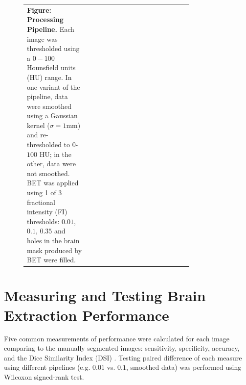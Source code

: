 \documentclass[final]{beamer}\usepackage[]{graphicx}\usepackage[]{color}
\begin{document}
\begin{frame}[fragile]
\begin{multicols}{2}
\begin{figure}
\begin{tabular}{m{0.3\linewidth}>{\centering}m{0.3\linewidth}p{0.2\linewidth}}
\multirow{1}{\linewidth}[5\baselineskip]{{\bf Figure: Processing Pipeline.} Each image was thresholded using a $0-100$ Hounsfield units (HU) range. In one variant of the pipeline, data were smoothed using a Gaussian kernel ($\sigma=1$mm) and re-thresholded to $0$-$100$ HU; in the other, data were not smoothed.  BET was applied using 1 of 3 fractional intensity (FI) thresholds: $0.01$, $0.1$, $0.35$ and holes in the brain mask produced by BET were filled. }
\end{tabular}
\end{figure}



\section{Measuring and Testing Brain Extraction Performance}
Five common measurements of performance were calculated for each image comparing to the manually segmented images: sensitivity, specificity, accuracy, and the Dice Similarity Index (DSI) \citep{dice_measures_1945}.  Testing paired difference of each measure using different pipelines (e.g. $0.01$ vs. $0.1$, smoothed data) was performed using Wilcoxon signed-rank test.











\end{multicols}
\end{frame}
\end{document}
